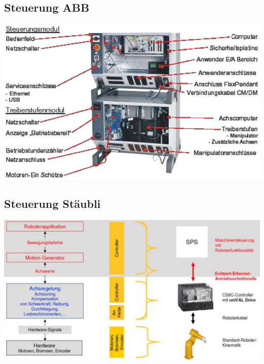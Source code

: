 \begin{minipage}{0.5\linewidth}
    \subsection{Steuerung ABB}
    \includegraphics[width=\linewidth]{./bilder/SteuerungABB}
\end{minipage}
\begin{minipage}{0.5\linewidth}
    \subsection{Steuerung Stäubli}
    \includegraphics[width=\linewidth]{./bilder/SteuerungStauebli}
\end{minipage}